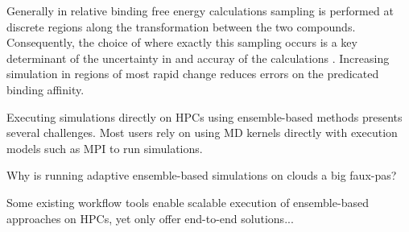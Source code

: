 Generally in relative binding free energy calculations sampling is performed at 
discrete regions along the transformation between the two compounds.
Consequently, the choice of where exactly this sampling occurs is a key determinant 
of the uncertainty in and accuray of the calculations \cite{Ruiter2013}.
Increasing simulation in regions of most rapid change reduces errors on the 
predicated binding affinity. 

Executing simulations directly on HPCs using ensemble-based methods presents 
several challenges. 
Most users rely on using MD kernels directly with 
execution models such as MPI to run simulations. 

Why is running adaptive ensemble-based simulations on clouds a big faux-pas?

Some existing workflow tools enable scalable execution of ensemble-based 
approaches on HPCs, yet only offer end-to-end solutions...

